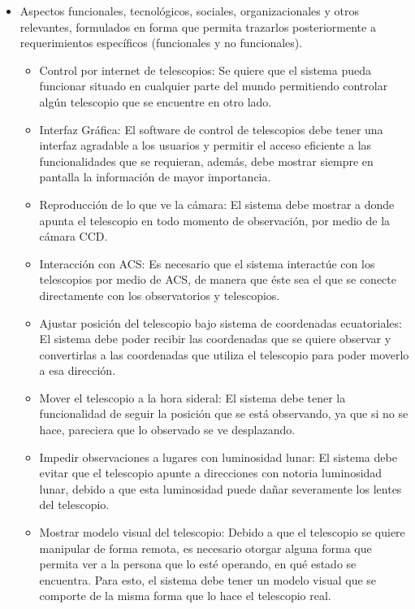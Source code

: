 \documentclass[letterpaper,spanish,10pt]{article}
\begin{document}
\begin{itemize}

\item Aspectos funcionales, tecnol\'ogicos, sociales, organizacionales y otros relevantes, formulados en forma que permita trazarlos posteriormente a requerimientos espec\'ificos (funcionales y no funcionales).

\begin{itemize}

\item Control por internet de telescopios: Se quiere que el sistema pueda funcionar situado en cualquier parte del mundo permitiendo controlar alg\'un telescopio que se encuentre en otro lado.

\item Interfaz Gr\'afica: El software de control de telescopios debe tener una interfaz agradable a los usuarios y permitir el acceso eficiente a las funcionalidades que se requieran, adem\'as, debe mostrar siempre en pantalla la informaci\'on de mayor importancia.

\item Reproducci\'on de lo que ve la c\'amara: El sistema debe mostrar a donde apunta el telescopio en todo momento de observaci\'on, por medio de la c\'amara CCD.

\item Interacci\'on con ACS: Es necesario que el sistema interact\'ue con los telescopios por medio de ACS, de manera que \'este sea el que se conecte directamente con los observatorios y telescopios.

\item Ajustar posici\'on del telescopio bajo sistema de coordenadas ecuatoriales: El sistema debe poder recibir las coordenadas que se quiere observar y convertirlas a las coordenadas que utiliza el telescopio para poder moverlo a esa direcci\'on.

\item Mover el telescopio a la hora sideral: El sistema debe tener la funcionalidad de seguir la posici\'on que se est\'a observando, ya que si no se hace, pareciera que lo observado se ve desplazando.

\item Impedir observaciones a lugares con luminosidad lunar: El sistema debe evitar que el telescopio apunte a direcciones con notoria luminosidad lunar, debido a que esta luminosidad puede da\~nar severamente los lentes del telescopio.

\item Mostrar modelo visual del telescopio: Debido a que el telescopio se quiere manipular de forma remota, es necesario otorgar alguna forma que permita ver a la persona que lo est\'e operando, en qu\'e estado se encuentra. Para esto, el sistema debe tener un modelo visual que se comporte de la misma forma que lo hace el telescopio real.


\end{itemize}
\end{itemize}
\end{document}
